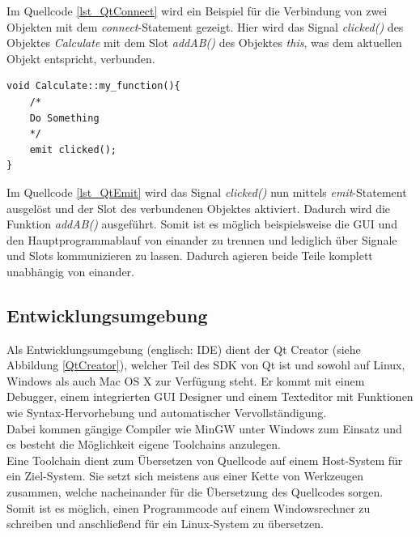 Im Quellcode \ref{lst_QtConnect} wird ein Beispiel für die Verbindung von zwei Objekten mit dem \textit{connect}-Statement gezeigt. Hier wird das Signal \textit{clicked()} des Objektes \textit{Calculate} mit dem Slot \textit{addAB()} des Objektes \textit{this}, was dem aktuellen Objekt entspricht, verbunden. \\

\begin{lstlisting}[caption={Qt \textit{emit}-Statement},label=lst_QtEmit]
void Calculate::my_function(){
	/*
	Do Something
	*/
	emit clicked();	
}
\end{lstlisting}

Im Quellcode \ref{lst_QtEmit} wird das Signal \textit{clicked()} nun mittels \textit{emit}-Statement ausgelöst und der Slot des verbundenen Objektes aktiviert. Dadurch wird die Funktion \textit{addAB()} ausgeführt. Somit ist es möglich beispielsweise die GUI und den Hauptprogrammablauf von einander zu trennen und lediglich über Signale und Slots kommunizieren zu lassen. Dadurch agieren beide Teile komplett unabhängig von einander.

\subsection{Entwicklungsumgebung}
Als Entwicklungsumgebung (englisch: \ac{IDE}) dient der Qt Creator (siehe Abbildung \ref{QtCreator}), welcher Teil des \ac{SDK} von Qt ist und sowohl auf Linux, Windows als auch Mac OS X zur Verfügung steht. Er kommt mit einem Debugger, einem integrierten \ac{GUI} Designer und einem Texteditor mit Funktionen wie Syntax-Hervorhebung und automatischer Vervollständigung. \\
Dabei kommen gängige Compiler wie MinGW unter Windows zum Einsatz und es besteht die Möglichkeit eigene Toolchains anzulegen. \\
Eine Toolchain dient zum Übersetzen von Quellcode auf einem Host-System für ein Ziel-System. Sie setzt sich meistens aus einer Kette von Werkzeugen zusammen, welche nacheinander für die Übersetzung des Quellcodes sorgen. Somit ist es möglich, einen Programmcode auf einem Windowsrechner zu schreiben und anschließend für ein Linux-System zu übersetzen.

